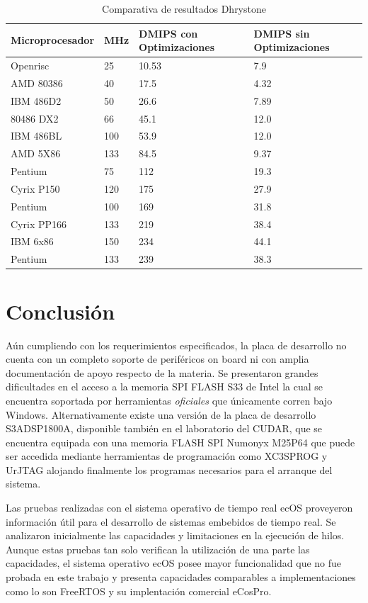 \begin{table}[h!]
\begin{center}
\begin{tabular}{ |l |l |l |l |}
\hline
\rowcolor[gray]{0.8} Microprocesador& MHz & DMIPS con Optimizaciones & DMIPS sin Optimizaciones \\
\hline
Openrisc		  &25	&10.53	&7.9\\
\hline
AMD 80386         &40   &17.5   &4.32\\
\hline
IBM 486D2         &50   &26.6   &7.89\\
\hline
80486 DX2         &66   &45.1   &12.0\\
\hline
IBM 486BL        &100   &53.9   &12.0\\
\hline
AMD 5X86         &133   &84.5   &9.37\\
\hline
Pentium           &75    &112   &19.3\\
\hline
Cyrix P150       &120    &175   &27.9\\
\hline
Pentium          &100    &169   &31.8\\
\hline
Cyrix PP166      &133    &219   &38.4\\
\hline
IBM 6x86         &150    &234   &44.1\\
\hline
Pentium          &133    &239   &38.3\\
\hline
\end{tabular}
\end{center}
\caption{Comparativa de resultados Dhrystone}
\end{table}

\section{Conclusión}
 Aún cumpliendo con
	los requerimientos especificados, la placa de desarrollo no cuenta con un completo soporte de periféricos on board ni con amplia documentación de
	apoyo respecto de la materia. Se presentaron grandes dificultades en el acceso a la memoria SPI FLASH S33 de Intel la cual se encuentra soportada por
	herramientas \textit{oficiales} que únicamente corren bajo Windows. Alternativamente existe una versión de la placa de desarrollo S3ADSP1800A,
	disponible también en el laboratorio del CUDAR, que se encuentra equipada con una memoria FLASH SPI Numonyx M25P64 que puede ser accedida mediante
	herramientas de programación como XC3SPROG y UrJTAG alojando finalmente los programas necesarios para el arranque del sistema.
	
	Las pruebas realizadas con el sistema operativo de tiempo real ecOS proveyeron información útil para el desarrollo de sistemas embebidos de tiempo
	real. Se analizaron inicialmente las capacidades y limitaciones en la ejecución de hilos. Aunque estas pruebas tan solo verifican la utilización de
	una parte las capacidades, el sistema operativo ecOS posee mayor funcionalidad que no fue probada en este trabajo y presenta capacidades comparables
	a implementaciones como lo son FreeRTOS y su implentación comercial eCosPro.
	
